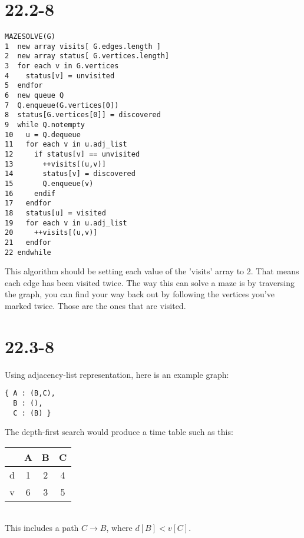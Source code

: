\documentclass{article}
\begin{document}
\section*{22.2-8}
\begin{verbatim}
MAZESOLVE(G)
1  new array visits[ G.edges.length ]
2  new array status[ G.vertices.length]
3  for each v in G.vertices
4    status[v] = unvisited
5  endfor
6  new queue Q
7  Q.enqueue(G.vertices[0])
8  status[G.vertices[0]] = discovered
9  while Q.notempty
10   u = Q.dequeue
11   for each v in u.adj_list
12     if status[v] == unvisited
13       ++visits[(u,v)]
14       status[v] = discovered
15       Q.enqueue(v)
16     endif
17   endfor
18   status[u] = visited
19   for each v in u.adj_list
20     ++visits[(u,v)]
21   endfor
22 endwhile
\end{verbatim}
This algorithm should be setting each value of the 'visits' array to 2.
That means each edge has been visited twice. The way this can solve a maze
is by traversing the graph, you can find your way back out by following the
vertices you've marked twice. Those are the ones that are visited.\\

\section*{22.3-8}
Using adjacency-list representation, here is an example graph:
\begin{verbatim}
{ A : (B,C),
  B : (),
  C : (B) }
\end{verbatim}
The depth-first search would produce a time table such as this:\\
\begin{tabular}{|c|c c c|}
\hline
  & A & B & C\\
\hline
d & 1 & 2 & 4\\
\hline
v & 6 & 3 & 5\\
\hline
\end{tabular}
\\This includes a path $C \rightarrow B$, where $d[B] < v[C]$.\\
\end{document}
